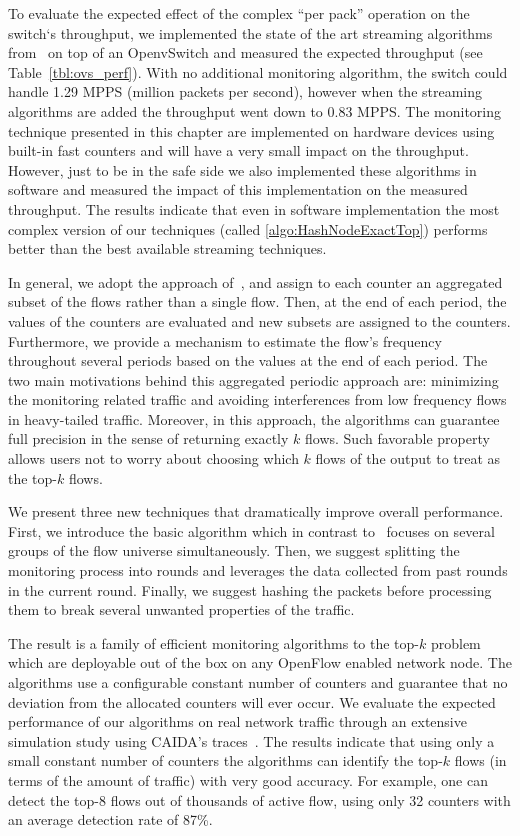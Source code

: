 To evaluate the expected effect of the complex ``per pack'' operation on the switch`s throughput, we implemented the state of the art streaming algorithms from~\cite{Ben-Basat2017} on top of an OpenvSwitch and measured the expected throughput (see Table~\ref{tbl:ovs_perf}).  With no additional monitoring algorithm, the switch could handle 1.29 MPPS (million packets per second), however when the streaming algorithms are added the throughput went down to 0.83 MPPS.  The monitoring technique presented in this chapter are implemented on hardware devices using built-in fast counters and will have a very small impact on the throughput.  However, just to be in the safe side we also implemented these algorithms in software and measured the impact of this implementation on the measured throughput. The results indicate that even in software implementation the most complex version of our techniques (called \ref{algo:HashNodeExactTop}) performs better than the best available streaming techniques. 

In general, we adopt the approach of~\cite{Moraney2016}, and assign to each counter an aggregated subset of the flows rather than a single flow. Then, at the end of each period, the values of the counters are evaluated and new subsets are assigned to the counters. Furthermore, we provide a mechanism to estimate the flow's frequency throughout several periods based on the values at the end of each period. The two main motivations behind this aggregated periodic approach are: minimizing the monitoring related traffic and avoiding interferences from low frequency flows in heavy-tailed traffic. Moreover, in this approach, the algorithms can guarantee full precision in the sense of returning exactly $k$ flows. Such favorable property allows users not to worry about choosing which $k$ flows of the output to treat as the top-$k$ flows.

We present three new techniques that dramatically improve overall performance. 
First, we introduce the basic algorithm which in contrast to~\cite{Moraney2016} focuses on several groups of the flow universe simultaneously.
Then, we suggest splitting the monitoring process into rounds and leverages the data collected from past rounds in the current round.
Finally, we suggest hashing the packets before processing them to break several unwanted properties of the traffic.

The result is a family of efficient monitoring algorithms to the top-$k$ problem which are deployable out of the box on any OpenFlow enabled network node. The algorithms use a configurable constant number of counters and guarantee that no deviation from the allocated counters will ever occur.  We evaluate the expected performance of our algorithms on real network traffic through an extensive simulation study using CAIDA’s traces~\cite{CAIDA14,CAIDA15,CAIDA2016}.  The results indicate that using only a small constant number of counters the algorithms can identify the top-$k$ flows (in terms of the amount of traffic) with very good accuracy.  For example, one can detect the top-8 flows out of thousands of active flow, using only 32 counters with an average detection rate of 87\%. 

